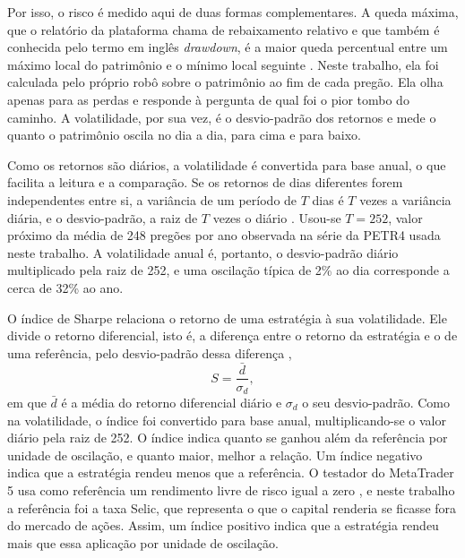 Por isso, o risco é medido aqui de duas formas complementares. A queda máxima, que o relatório
da plataforma chama de rebaixamento relativo e que também é conhecida pelo termo em
inglês \textit{drawdown}, é a maior queda percentual entre um máximo local do
patrimônio e o mínimo local seguinte \cite{metaquotesRelatorio}. Neste trabalho,
ela foi calculada pelo próprio robô sobre o patrimônio ao fim de cada pregão. Ela olha apenas
para as perdas e responde à pergunta de qual foi o pior tombo do caminho. A
volatilidade, por sua vez, é o desvio-padrão dos retornos e mede o quanto o
patrimônio oscila no dia a dia, para cima e para baixo.

Como os retornos são diários, a volatilidade é convertida para base anual, o que
facilita a leitura e a comparação. Se os retornos de dias diferentes forem
independentes entre si, a variância de um período de $T$ dias é $T$ vezes a
variância diária, e o desvio-padrão, a raiz de $T$ vezes o diário
\cite{sharpe1994}. Usou-se $T = 252$, valor próximo da média de 248 pregões por
ano observada na série da PETR4 usada neste trabalho. A volatilidade anual é, portanto, o desvio-padrão
diário multiplicado pela raiz de 252, e uma oscilação típica de 2\% ao dia
corresponde a cerca de 32\% ao ano.

O índice de Sharpe relaciona o retorno de uma estratégia à sua volatilidade. Ele
divide o retorno diferencial, isto é, a diferença entre o retorno da estratégia e
o de uma referência, pelo desvio-padrão dessa diferença \cite{sharpe1994},
\begin{equation*}
S = \frac{\bar{d}}{\sigma_d},
\end{equation*}
em que $\bar{d}$ é a média do retorno diferencial diário e $\sigma_d$ o seu
desvio-padrão. Como na volatilidade, o índice foi convertido para base anual,
multiplicando-se o valor diário pela raiz de 252. O índice indica quanto se ganhou além da referência por unidade de
oscilação, e quanto maior, melhor a relação. Um índice negativo indica que a
estratégia rendeu menos que a referência. O testador do MetaTrader 5 usa como
referência um rendimento livre de risco igual a zero \cite{metaquotesRelatorio}, e
neste trabalho a referência foi a taxa Selic, que representa o que o capital
renderia se ficasse fora do mercado de ações. Assim, um índice positivo indica que a estratégia rendeu mais que
essa aplicação por unidade de oscilação.


